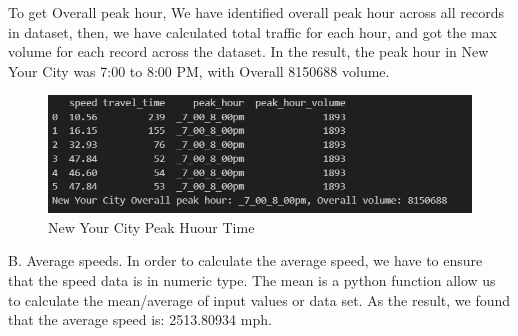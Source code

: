 \newline
\newline
To get Overall peak hour, We have identified overall peak hour across all records in dataset, then, we have calculated total traffic for each hour, and got the max volume for each record across the dataset. In the result, the peak hour in New Your City was 7:00 to 8:00 PM, with Overall 8150688 volume.
\newline
\begin{figure}[h]
    \centering
    \includegraphics[width=1\linewidth]{figures/peak_huours.PNG}
    \caption{New Your City Peak Huour Time}
    \label{fig:New Your City Peak Huour Time}
\end{figure}
\newline
\newline B. Average speeds.
\newline
In order to calculate the average speed, we have to ensure that the speed data is in numeric type. The mean is a python function allow us to calculate the mean/average of input values or data set. As the result, we found that the average speed is: 2513.80934 mph.
\newline
